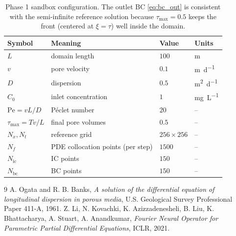 \documentclass[11pt]{article}
\begin{document}
\begin{table}[h]
\centering
\begin{tabular}{llll}
\toprule
Symbol & Meaning & Value & Units \\
\midrule
$L$   & domain length        & $100$            & \si{m} \\
$v$   & pore velocity        & $0.1$            & \si{m.d^{-1}} \\
$D$   & dispersion           & $0.5$            & \si{m^{2}.d^{-1}} \\
$C_0$ & inlet concentration  & $1$              & \si{mg.L^{-1}} \\
$\mathrm{Pe}=vL/D$ & P\'eclet number & $20$ & -- \\
$\tau_{\max}=Tv/L$ & final pore volumes & $0.5$ & -- \\
\midrule
$N_x,N_t$ & reference grid & $256\times 256$ & -- \\
$N_f$   & PDE collocation points (per step) & $1500$ & -- \\
$N_{\mathrm{ic}}$ & IC points & $150$ & -- \\
$N_{\mathrm{bc}}$ & BC points & $150$ & -- \\
\bottomrule
\end{tabular}
\caption{Phase 1 sandbox configuration. The outlet BC
\eqref{eq:bc_out} is consistent with the semi-infinite reference solution
because $\tau_{\max}=0.5$ keeps the front (centered at $\xi=\tau$) well inside
the domain.}
\label{tab:params}
\end{table}


\begin{thebibliography}{9}
A. Ogata and R. B. Banks,
\textit{A solution of the differential equation of longitudinal dispersion in
porous media}, U.S. Geological Survey Professional Paper 411-A, 1961.
Z. Li, N. Kovachki, K. Azizzadenesheli, B. Liu, K. Bhattacharya, A. Stuart,
A. Anandkumar, \textit{Fourier Neural Operator for Parametric Partial
Differential Equations}, ICLR, 2021.
\end{thebibliography}
\end{document}
